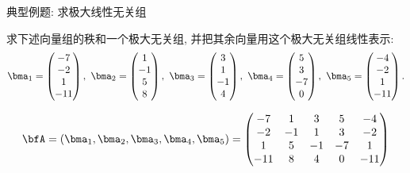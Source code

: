 \begin{frame}{典型例题: 求极大线性无关组}
	\onslide<+->
	\begin{example}
		求下述向量组的秩和一个极大无关组, 并把其余向量用这个极大无关组线性表示:
		\[\bma_1=\begin{pmatrix}
			-7\\-2\\1\\-11
		\end{pmatrix},\ 
		\bma_2=\begin{pmatrix}
			1\\-1\\5\\8
		\end{pmatrix},\ 
		\bma_3=\begin{pmatrix}
			3\\1\\-1\\4
		\end{pmatrix},\ 
		\bma_4=\begin{pmatrix}
			5\\3\\-7\\0
		\end{pmatrix},\ 
		\bma_5=\begin{pmatrix}
			-4\\-2\\1\\-11
		\end{pmatrix}.
		\]
	\end{example}
	\onslide<+->
	\begin{solution}
		\[\bfA=(\bma_1,\bma_2,\bma_3,\bma_4,\bma_5)
		=\begin{pmatrix}
			-7&1&3&5&-4\\
			-2&-1&1&3&-2\\
			1&5&-1&-7&1\\
			-11&8&4&0&-11
		\end{pmatrix}\]
	\end{solution}
\end{frame}


